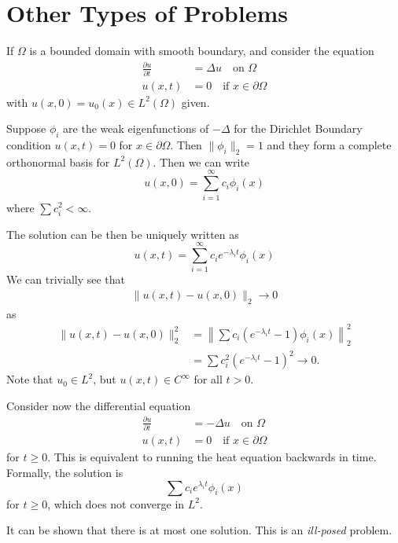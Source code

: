 \documentclass[10pt, oneside, reqno]{amsart}
\theoremstyle{plain}%
\numberwithin{equation}{section}
\theoremstyle{definition}
\theoremstyle{remark}
\begin{document}
\section{Other Types of Problems} %
\label{sec:other_types_of_problems}
If $\Omega$ is a bounded domain with smooth boundary, and consider the equation \begin{align*}
    \frac{\partial u}{\partial t} &= \Delta u \quad \text{on $\Omega$} \\
    u(x, t) &= 0 \quad \text{if $x \in \partial \Omega$}
\end{align*} with $u(x, 0) = u_0(x) \in L^2(\Omega)$ given.  

Suppose $\phi_i$ are the weak eigenfunctions of $-\Delta$ for the Dirichlet Boundary condition $u(x, t) = 0$ for $x \in \partial \Omega$.  Then $\| \phi_i \|_2 = 1$ and they form a complete orthonormal basis for $L^2(\Omega)$.  Then we can write \[
    u(x, 0) = \sum_{i=1}^\infty c_i \phi_i(x)
\] where $\sum c_i^2 < \infty$.   

The solution can be then be uniquely written as \[
    u(x, t) = \sum_{i=1}^\infty c_i e^{-\lambda_i t} \phi_i(x)
\]  We can trivially see that \begin{align*}
    \| u(x, t) - u(x, 0) \|_2 \rightarrow 0 
\end{align*} as \begin{align*}
    \| u(x, t) - u(x, 0) \|_2^2 &= \left\| \sum c_i \left( e^{-\lambda_i t} - 1 \right) \phi_i(x)  \right\|_2^2 \\
    &= \sum c_i^2 \left( e^{-\lambda_i t} - 1 \right)^2 \rightarrow 0.
\end{align*}  Note that $u_0 \in L^2$, but $u(x, t) \in C^\infty$ for all $t > 0$.

Consider now the differential equation \begin{align*}
    \frac{\partial u}{\partial t} &= -\Delta u \quad \text{on $\Omega$} \\
    u(x, t) &= 0 \quad \text{if $x \in \partial \Omega$}
\end{align*} for $t \geq 0$.  This is equivalent to running the heat equation backwards in time.  Formally, the solution is \[
    \sum c_i e^{\lambda_i t} \phi_i(x) 
\] for $t \geq 0$, which does not converge in $L^2$.  

It can be shown that there is at most one solution.  This is an \emph{ill-posed} problem.


\end{document}
